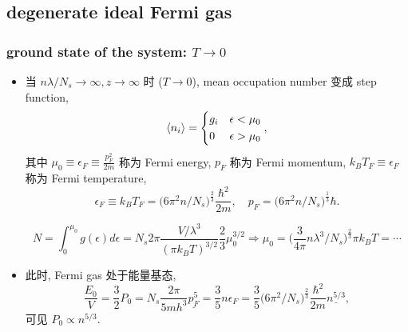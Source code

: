 \subsection{degenerate ideal Fermi gas}
\subsubsection{ground state of the system: $T \rightarrow 0$}
\begin{itemize}
	\item 当 $n \lambda / N_s \rightarrow \infty, z \rightarrow \infty$ 时 ($T \rightarrow 0$), mean occupation number 变成 step function,
	\begin{equation}
		\braket{n_i} = \begin{dcases}
			g_i & \epsilon < \mu_0 \\
			0 & \epsilon > \mu_0
		\end{dcases},
	\end{equation}
	其中 $\mu_0 \equiv \epsilon_F \equiv \frac{p_F^2}{2 m}$ 称为 Fermi energy, $p_F$ 称为 Fermi momentum, $k_B T_F \equiv \epsilon_F$ 称为 Fermi temperature,
	\begin{equation}
		\epsilon_F \equiv k_B T_F = \Big( 6 \pi^2 n / N_s \Big)^{\frac{2}{3}} \frac{\hbar^2}{2 m}, \quad p_F = \Big( 6 \pi^2 n / N_s \Big)^{\frac{1}{3}} \hbar.
	\end{equation}
	
	\begin{tcolorbox}[title=calculation:]
		\begin{equation}
			N = \int_0^{\mu_0} g(\epsilon) d\epsilon = N_s 2 \pi \frac{V / \lambda^3}{(\pi k_B T)^{3 / 2}} \frac{2}{3} \mu_0^{3 / 2} \Longrightarrow \mu_0 = \Big( \frac{3}{4 \pi} n \lambda^3 / N_s \Big)^{\frac{2}{3}} \pi k_B T = \cdots
		\end{equation}
	\end{tcolorbox}
	
	\item 此时, Fermi gas 处于能量基态,
	\begin{equation}
		\frac{E_0}{V} = \frac{3}{2} P_0 = N_s \frac{2 \pi}{5 m h^3} \underline{p_F^5} = \frac{3}{5} n \epsilon_F = \frac{3}{5} \Big( 6 \pi^2 / N_s \Big)^{\frac{2}{3}} \frac{\hbar^2}{2 m} \underline{n^{5 / 3}},
	\end{equation}
	可见 $P_0 \propto n^{5 / 3}$.
\end{itemize}

